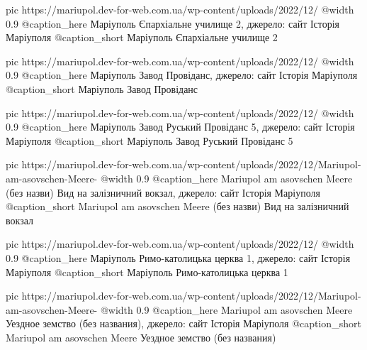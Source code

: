   pic https://mariupol.dev-for-web.com.ua/wp-content/uploads/2022/12/%
  @width 0.9
  @caption_here Маріуполь Єпархіальне училище 2, джерело: сайт Історія Маріуполя
  @caption_short Маріуполь Єпархіальне училище 2

  pic https://mariupol.dev-for-web.com.ua/wp-content/uploads/2022/12/%
  @width 0.9
  @caption_here Маріуполь Завод Провіданс, джерело: сайт Історія Маріуполя
  @caption_short Маріуполь Завод Провіданс

  pic https://mariupol.dev-for-web.com.ua/wp-content/uploads/2022/12/%
  @width 0.9
  @caption_here Маріуполь Завод Руський Провіданс 5, джерело: сайт Історія Маріуполя
  @caption_short Маріуполь Завод Руський Провіданс 5

  pic https://mariupol.dev-for-web.com.ua/wp-content/uploads/2022/12/Mariupol-am-asovschen-Meere-%
  @width 0.9
  @caption_here Mariupol am asovschen Meere (без назви) Вид на залізничний вокзал, джерело: сайт Історія Маріуполя
  @caption_short Mariupol am asovschen Meere (без назви) Вид на залізничний вокзал

  pic https://mariupol.dev-for-web.com.ua/wp-content/uploads/2022/12/%
  @width 0.9
  @caption_here Маріуполь Римо-католицька церква 1, джерело: сайт Історія Маріуполя
  @caption_short Маріуполь Римо-католицька церква 1

  pic https://mariupol.dev-for-web.com.ua/wp-content/uploads/2022/12/Mariupol-am-asovschen-Meere-%
  @width 0.9
  @caption_here Mariupol am asovschen Meere Уездное земство (без названия), джерело: сайт Історія Маріуполя
  @caption_short Mariupol am asovschen Meere Уездное земство (без названия)

